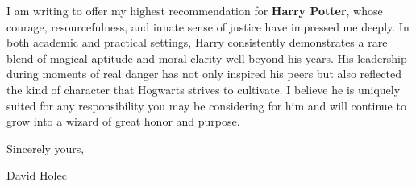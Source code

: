 \documentclass{mul-letter}
\begin{document}

%

\showdate       
\subject{Letter of Support for Mr. Harry Potter}

I am writing to offer my highest recommendation for \textbf{Harry Potter}, whose courage, resourcefulness, and innate sense of justice have impressed me deeply. 
In both academic and practical settings, Harry consistently demonstrates a rare blend of magical aptitude and moral clarity well beyond his years. 
His leadership during moments of real danger has not only inspired his peers but also reflected the kind of character that Hogwarts strives to cultivate. 
I believe he is uniquely suited for any responsibility you may be considering for him and will continue to grow into a wizard of great honor and purpose.


Sincerely yours,\bigskip\bigskip


\hspace*{10cm}David Holec
\end{document}
